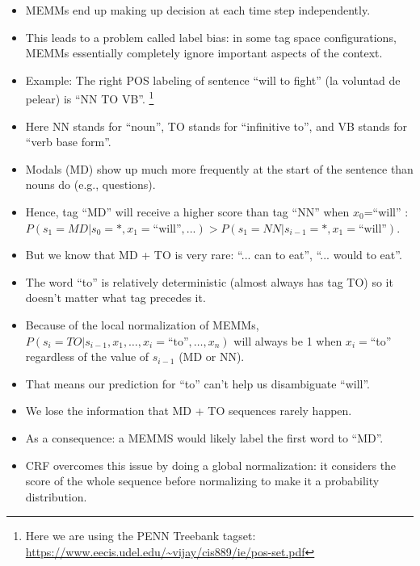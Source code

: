 \begin{itemize}

\item MEMMs end up making up decision at each time step independently.

\item This leads to a problem called label bias: in some tag space configurations, MEMMs essentially completely ignore important aspects of the context.

\item Example: The right POS labeling of sentence ``will to fight'' (la voluntad de pelear) is ``NN TO VB''. \footnote{Here we are using the PENN Treebank tagset: \url{https://www.eecis.udel.edu/~vijay/cis889/ie/pos-set.pdf}} 

\item Here NN stands for ``noun'', TO stands for ``infinitive to'',  and VB stands for ``verb base form''.

\item Modals (MD) show up much more frequently at the start of the sentence than nouns do (e.g., questions).

\item Hence, tag ``MD'' will receive a higher score than tag ``NN'' when $x_0$=``will'' : $P(s_1 = MD|s_{0} = *,x_1 = \text{``will''},...) > P( s_1 = NN| s_{i-1} = *, x_1 = \text{``will''})$.


\item But we know that MD + TO is very rare: ``... can to eat'', ``... would to eat''.


\item The word ``to'' is relatively deterministic (almost always has tag TO) so it doesn't matter what tag precedes it.

\item Because of the local normalization of MEMMs, $P(s_i = TO | s_{i-1}, x_1, \dots, x_i = \text{``to''}, \dots, x_n)$ will always be 1 when $x_i=$``to'' regardless of the value of $s_{i-1}$ (MD or NN).

\item That means our prediction for ``to'' can't help us disambiguate ``will''.  

\item We lose the information that MD + TO sequences rarely happen.

\item As a consequence: a MEMMS would likely label the first word to ``MD''.

\item CRF overcomes this issue by doing a global normalization: it considers the score of the whole sequence before normalizing to make it a probability distribution.



\end{itemize}



